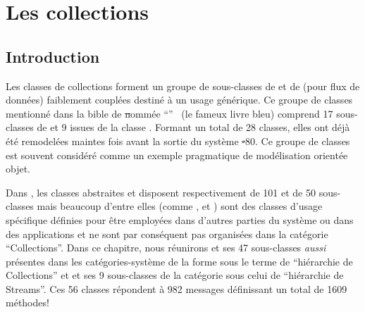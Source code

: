 \documentclass[a4paper,10pt,twoside]{book}
\begin{document}
	\sloppy
\fi
\chapter{Les collections}
\section{Introduction}

Les classes de collections forment un groupe de sous-classes de  et de  (pour flux de données) faiblement couplées destiné à un usage générique.
Ce groupe de classes mentionné dans la bible de \st nommée ``''~\cite{Gold83a} (le fameux livre bleu) comprend 17 sous-classes de  
et 9 issues de la classe . Formant un total de 28 classes, elles
ont déjà été remodelées maintes fois avant la sortie du système \st-80. Ce groupe de classes est souvent 
considéré comme un exemple pragmatique de modélisation orientée objet.

Dans \pharo, les classes abstraites  et 
disposent respectivement de 101 et de 50 sous-classes mais beaucoup d'entre elles
(comme \mbox{,}  et )
sont des classes d'usage spécifique définies pour être employées
dans d'autres parties du système ou dans des applications et ne sont par conséquent 
pas organisées dans la catégorie ``Collections''. 
Dans ce chapitre, nous réunirons  et ses 47 sous-classes
\emph{aussi} présentes dans les catégories-système de la forme 
sous le terme de ``hiérarchie de Collections''
et  et ses 9 sous-classes de la catégorie  sous celui de ``hiérarchie de Streams''.
Ces 56 classes répondent à 982 messages définissant un total de
1609 méthodes!
\end{document}

